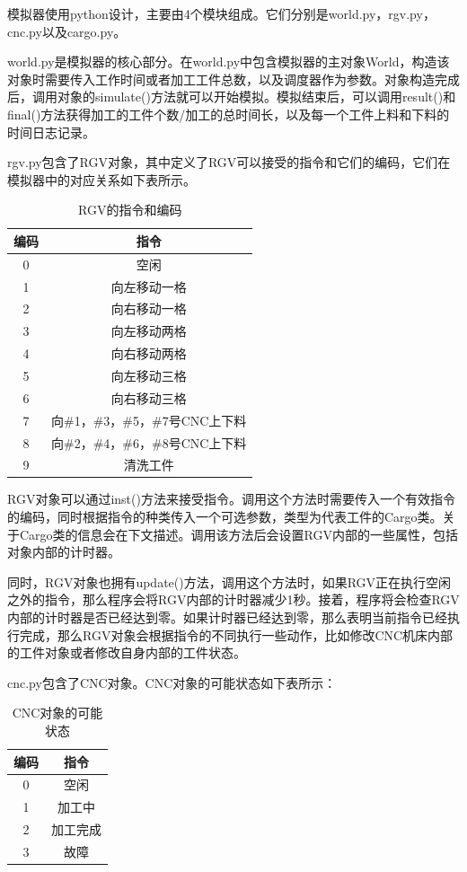 \documentclass{cumcmthesis}
\begin{document}
	模拟器使用python设计，主要由4个模块组成。它们分别是world.py，rgv.py，cnc.py以及cargo.py。
	
	world.py是模拟器的核心部分。在world.py中包含模拟器的主对象World，构造该对象时需要传入工作时间或者加工工件总数，以及调度器作为参数。对象构造完成后，调用对象的simulate()方法就可以开始模拟。模拟结束后，可以调用result()和final()方法获得加工的工件个数/加工的总时间长，以及每一个工件上料和下料的时间日志记录。
	
	rgv.py包含了RGV对象，其中定义了RGV可以接受的指令和它们的编码，它们在模拟器中的对应关系如下表所示。
	
	\begin{table}[!htbp]
		\centering
		\begin{tabular}{c|c}
			\toprule[1.5pt]
			编码 & 指令 \\
			\midrule[1pt]
			0 & 空闲 \\
			1 & 向左移动一格\\
			2 & 向右移动一格\\
			3 & 向左移动两格\\
			4 & 向右移动两格\\
			5 & 向左移动三格\\
			6 & 向右移动三格\\
			7 & 向\#1，\#3，\#5，\#7号CNC上下料\\
			8 & 向\#2，\#4，\#6，\#8号CNC上下料\\
			9 & 清洗工件\\
			\bottomrule[1.5pt]
		\end{tabular}
		\caption{RGV的指令和编码}\label{rgv指令和编码}
	\end{table}
	
	RGV对象可以通过inst()方法来接受指令。调用这个方法时需要传入一个有效指令的编码，同时根据指令的种类传入一个可选参数，类型为代表工件的Cargo类。关于Cargo类的信息会在下文描述。调用该方法后会设置RGV内部的一些属性，包括对象内部的计时器。
	
	同时，RGV对象也拥有update()方法，调用这个方法时，如果RGV正在执行空闲之外的指令，那么程序会将RGV内部的计时器减少1秒。接着，程序将会检查RGV内部的计时器是否已经达到零。如果计时器已经达到零，那么表明当前指令已经执行完成，那么RGV对象会根据指令的不同执行一些动作，比如修改CNC机床内部的工件对象或者修改自身内部的工件状态。
	
	cnc.py包含了CNC对象。CNC对象的可能状态如下表所示：
	
	\begin{table}[!htbp]
		\centering
		\begin{tabular}{c|c}
			\toprule[1.5pt]
			编码 & 指令 \\
			\midrule[1.5pt]
			0 & 空闲 \\
			1 & 加工中\\
			2 & 加工完成\\
			3 & 故障\\
			\bottomrule[1.5pt]
		\end{tabular}
		\caption{CNC对象的可能状态}
	\end{table}
	
\end{document}
